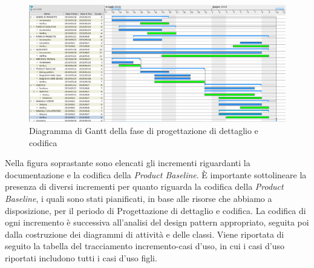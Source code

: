 \begin{figure}[H]
	\includegraphics[width=0.99\linewidth]{res/images/gantt_pd.png}
	\caption{Diagramma di Gantt della fase di progettazione di dettaglio e codifica}
\end{figure}

Nella figura soprastante sono elencati gli incrementi riguardanti la documentazione e la codifica della \textit{Product Baseline}\glo.
È importante sottolineare la presenza di diversi incrementi per quanto riguarda la codifica della \textit{Product Baseline}, i quali sono stati pianificati, in base alle risorse che abbiamo a disposizione, per il periodo di Progettazione di dettaglio e codifica.
La codifica di ogni incremento è successiva all'analisi del design pattern appropriato, seguita poi dalla costruzione dei diagrammi di attività e delle classi.
Viene riportata di seguito la tabella del tracciamento incremento-casi d’uso, in cui i casi d’uso riportati includono tutti i casi d’uso figli.

